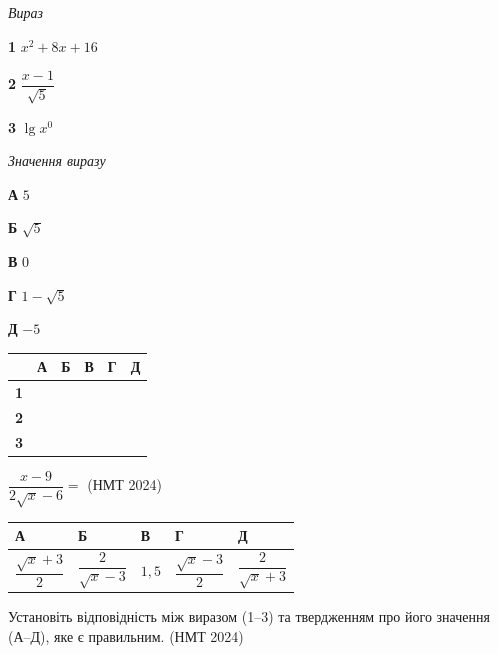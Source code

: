 \documentclass[14pt]{extarticle}
\newcommand{\answerTableBig}[5]{
\begin{center}
\begin{tabular}{|*{5}{>{\centering\arraybackslash}m{2.8cm}|}}
\hline
\rule[-0.3cm]{0pt}{0.8cm}\textbf{А} & \textbf{Б} & \textbf{В} & \textbf{Г} & \textbf{Д} \\
\hline
\rule[-0.6cm]{0pt}{1.4cm}#1 & \rule[-0.6cm]{0pt}{1.4cm}#2 & \rule[-0.6cm]{0pt}{1.4cm}#3 & \rule[-0.6cm]{0pt}{1.4cm}#4 & \rule[-0.6cm]{0pt}{1.4cm}#5 \\
\hline
\end{tabular}
\end{center}
}
\newcommand{\matchTable}{
\begin{tabular}{|>{\centering\arraybackslash}p{0.3cm}|*{5}{>{\centering\arraybackslash}p{0.3cm}|}}
\hline
& \textbf{А} & \textbf{Б} & \textbf{В} & \textbf{Г} & \textbf{Д} \\
\hline
\textbf{1} & \rule{0pt}{0.3cm} & & & & \\
\hline
\textbf{2} & \rule{0pt}{0.3cm} & & & & \\
\hline
\textbf{3} & \rule{0pt}{0.3cm} & & & & \\
\hline
\end{tabular}
}
\newcommand{\task}[2]{\noindent\makebox[1.5em][l]{\textbf{#1.}}\parbox[t]{\dimexpr\textwidth-1.5em}{#2}}
\newcommand{\nmtyear}[1]{\hfill{\small\color{yearcolor}(НМТ #1)}}
\begin{document}
\vspace{0.3cm}
\begin{minipage}{0.3\textwidth}
\textit{Вираз}

\vspace{0.2cm}
\textbf{1} \quad $x^2 + 8x + 16$

\vspace{0.3cm}
\textbf{2} \quad $\dfrac{x - 1}{\sqrt{5}}$

\vspace{0.2cm}
\textbf{3} \quad $\lg x^0$
\end{minipage}
\hfill
\begin{minipage}{0.3\textwidth}
\textit{Значення виразу}

\vspace{0.2cm}
\textbf{А} \quad $5$

\vspace{0.2cm}
\textbf{Б} \quad $\sqrt{5}$

\vspace{0.2cm}
\textbf{В} \quad $0$

\vspace{0.2cm}
\textbf{Г} \quad $1 - \sqrt{5}$

\vspace{0.2cm}
\textbf{Д} \quad $-5$
\end{minipage}
\hfill
\begin{minipage}{0.2\textwidth}
\matchTable
\end{minipage}

\vspace{0.7cm}

\task{35}{$\dfrac{x - 9}{2\sqrt{x} - 6} =$ \nmtyear{2024}}
\answerTableBig{$\dfrac{\sqrt{x} + 3}{2}$}{$\dfrac{2}{\sqrt{x} - 3}$}{$1{,}5$}{$\dfrac{\sqrt{x} - 3}{2}$}{$\dfrac{2}{\sqrt{x} + 3}$}

\vspace{0.5cm}

\task{36}{Установіть відповідність між виразом (1--3) та твердженням про його значення (А--Д), яке є правильним. \nmtyear{2024}}
\end{document}
